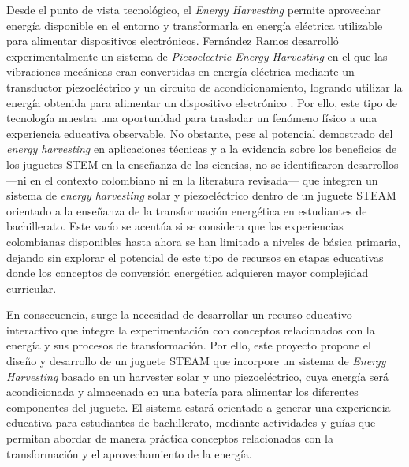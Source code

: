 \documentclass[11pt]{article}
\begin{document}
Desde el punto de vista tecnológico, el \textit{Energy Harvesting} permite aprovechar energía disponible en el entorno y transformarla en energía eléctrica utilizable para alimentar dispositivos electrónicos. Fernández Ramos desarrolló experimentalmente un sistema de \textit{Piezoelectric Energy Harvesting} en el que las vibraciones mecánicas eran convertidas en energía eléctrica mediante un transductor piezoeléctrico y un circuito de acondicionamiento, logrando utilizar la energía obtenida para alimentar un dispositivo electrónico \cite{FernandezRamos2017}. Por ello, este tipo de tecnología muestra una oportunidad para trasladar un fenómeno físico a una experiencia educativa observable. No obstante, pese al potencial demostrado del \textit{energy harvesting} en aplicaciones técnicas y a la evidencia sobre los beneficios de los juguetes STEM en la enseñanza de las ciencias, no se identificaron desarrollos —ni en el contexto colombiano ni en la literatura revisada— que integren un sistema de \textit{energy harvesting} solar y piezoeléctrico dentro de un juguete STEAM orientado a la enseñanza de la transformación energética en estudiantes de bachillerato. Este vacío se acentúa si se considera que las experiencias colombianas disponibles hasta ahora se han limitado a niveles de básica primaria, dejando sin explorar el potencial de este tipo de recursos en etapas educativas donde los conceptos de conversión energética adquieren mayor complejidad curricular.

En consecuencia, surge la necesidad de desarrollar un recurso educativo interactivo que integre la experimentación con conceptos relacionados con la energía y sus procesos de transformación. Por ello, este proyecto propone el diseño y desarrollo de un juguete STEAM que incorpore un sistema de \textit{Energy Harvesting} basado en un harvester solar y uno piezoeléctrico, cuya energía será acondicionada y almacenada en una batería para alimentar los diferentes componentes del juguete. El sistema estará orientado a generar una experiencia educativa para estudiantes de bachillerato, mediante actividades y guías que permitan abordar de manera práctica conceptos relacionados con la transformación y el aprovechamiento de la energía.

\newpage
\end{document}
